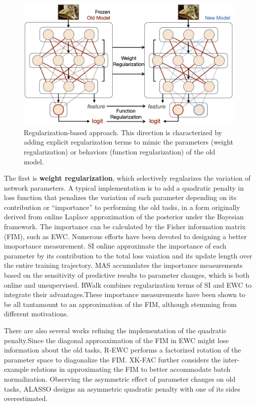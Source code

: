 \begin{figure}[H]
	\centering
	\includegraphics[width=0.7\linewidth]{imgs/continual_learning/cl_2.png}
	\caption{Regularization-based approach. This direction is characterized by adding explicit regularization terms to mimic the parameters (weight regularization) or behaviors (function regularization) of the old model.}
	\label{cl_2}
\end{figure}

The first is \textbf{weight regularization}, which selectively regularizes the variation of network parameters. A typical implementation is to add a quadratic penalty in loss function that penalizes the variation of each parameter depending on its contribution or ``importance'' to performing the old tasks, in a form originally derived from online Laplace approximation of the posterior under the Bayesian framework. The importance can be calculated by the Fisher information matrix (FIM), such as EWC. Numerous efforts have been devoted to designing a better imoportance measurement. SI online approximate the importance of each parameter by its contribution to the total loss vaiation and its update length over the entire training trajectory. MAS accumulates the importance measurements based on the sensitivity of predictive results to parameter changes, which is both online and unsupervised. RWalk combines regularization terms of SI and EWC to integrate their advantages.These importance measurements have been shown to be all tantamount to an approximation of the FIM, although stemming from different motivations.

There are also several works refining the implementation of the quadratic penalty.Since the diagonal approaximation of the FIM in EWC might lose information about the old tasks, R-EWC performs a factorized rotation of the parameter space to diagonalize the FIM. XK-FAC further considers the inter-example relations in approximating the FIM to better accommodate batch normalization. Observing the asymmetric effect of parameter changes on old tasks, ALASSO designs an asymmetric quadratic penalty with one of its sides overestimated.

